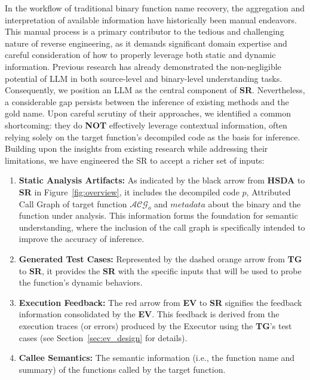 \documentclass[acmsmall,screen,review,anonymous]{acmart} %
\begin{document}
In the workflow of traditional binary function name recovery, the aggregation and interpretation of available information have historically been manual endeavors. This manual process is a primary contributor to the tedious and challenging nature of reverse engineering, as it demands significant domain expertise and careful consideration of how to properly leverage both static and dynamic information. Previous research has already demonstrated the non-negligible potential of LLM in both source-level\cite{cs_chatgpt, multi_intent_LLM, statement_cs_LLM, LLM_cs, scs_via_LLM, structured_cs_hyctx, cs_beyond_function, CORE, Calibration_LLM_cs, SimLLM} and binary-level \cite{shang_how_2024, SymGen, FoC, Bin2Summary, BinMetric, DeGPT} understanding tasks. Consequently, we position an LLM as the central component of \textbf{SR}. Nevertheless, a considerable gap persists between the inference of existing methods \cite{SymGen, XFL} and the gold name. Upon careful scrutiny of their approaches, we identified a common shortcoming: they do \textbf{NOT} effectively leverage contextual information, often relying solely on the target function's decompiled code as the basis for inference. Building upon the insights from existing research while addressing their limitations, we have engineered the SR to accept a richer set of inputs:

\begin{enumerate}
    \item \textbf{Static Analysis Artifacts:} As indicated by the black arrow from \textbf{HSDA} to \textbf{SR} in Figure~\ref{fig:overview}, it includes the decompiled code $p$, Attributed Call Graph of target function $\mathcal{ACG}_o$ and $metadata$ about the binary and the function under analysis. This information forms the foundation for semantic understanding, where the inclusion of the call graph is specifically intended to improve the accuracy of inference.
    \item \textbf{Generated Test Cases:} Represented by the dashed orange arrow from \textbf{TG} to \textbf{SR}, it provides the \textbf{SR} with the specific inputs that will be used to probe the function's dynamic behaviors.
    \item \textbf{Execution Feedback:} The red arrow from \textbf{EV} to \textbf{SR} signifies the feedback information consolidated by the \textbf{EV}. This feedback is derived from the execution traces (or errors) produced by the Executor using the \textbf{TG}'s test cases (see Section~\ref{sec:ev_design} for details).
    \item \textbf{Callee Semantics:} The semantic information (i.e., the function name and summary) of the functions called by the target function.
\end{enumerate}
\end{document}
